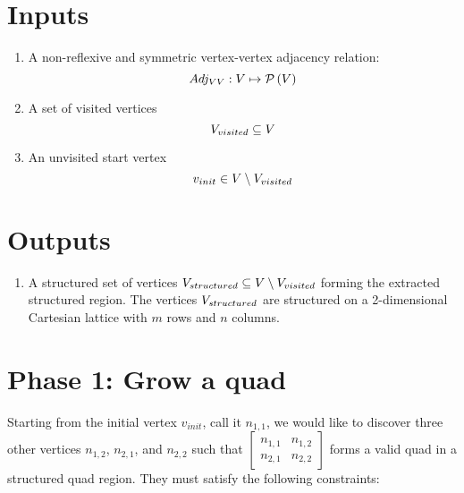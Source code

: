 \newcommand{\vinit}{v_{init}}

\newcommand{\Quad}[4]{\begin{bmatrix} #1 & #2 \\ #3 & #4 \end{bmatrix}}

\newcommand{\Qinit}{\Quad{n_{1,1}} {n_{1,2}} {n_{2,1}} {n_{2,2}} }

\newcommand{\Qinitmirror}{\Quad {n_{1,2}} {n_{1,1}} {n_{2,2}} {n_{2,1}}}



\section{Inputs}
\begin{enumerate}
\item A non-reflexive and symmetric vertex-vertex adjacency relation:
$$ Adj_{VV}: V \mapsto \mathcal P \left({V}\right) $$

\item A set of visited vertices
$$ V_{visited} \subseteq V $$

\item An unvisited start vertex
$$ \vinit \in \VertexSet \setminus \Visited $$
\end{enumerate}


\section{Outputs}
\begin{enumerate}
\item A structured set of vertices $V_{structured} \subseteq V \setminus V_{visited} $ forming the extracted structured region.
The vertices $V_{structured}$ are structured on a 2-dimensional Cartesian lattice with $m$ rows and $n$ columns.
\end{enumerate}



\section{Phase 1: Grow a quad}
\label{sec:grow_a_quad}
Starting from the initial vertex $\vinit$, call it $n_{1,1}$, we would like to discover three other vertices $n_{1,2}$, $n_{2,1}$, and $n_{2,2}$ such that $\Qinit$ forms a valid quad in a structured quad region. They must satisfy the following constraints:

